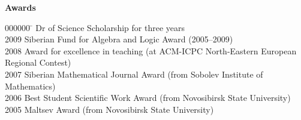 \documentclass[12pt]{article}
\begin{document}
\centerline{\bf Awards}
\begin{tabbing}
000000	\=		\> Dr of Science Scholarship for three years\\
2009	\> Siberian Fund for Algebra and Logic Award (2005--2009)\\
2008	\> Award for excellence in teaching (at ACM-ICPC North-Eastern European Regional Contest)\\
2007	\> Siberian Mathematical Journal Award (from Sobolev Institute of Mathematics)\\
2006	\> Best Student Scientific Work Award (from Novosibirsk State University)\\
2005	\> Maltsev Award (from Novosibirsk State University)\iftoggle{full}{\\
2000	\> Gold Medal (from the Government of Russia, Novokuznetsk High School \#32)
}{}
\end{tabbing}
\end{document}
